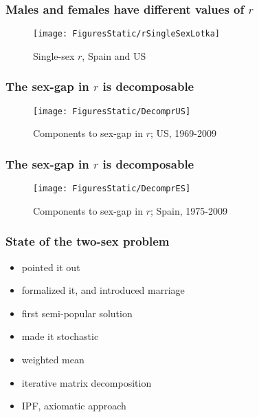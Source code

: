 \documentclass{beamer}
\begin{document}

\begin{frame}
  \frametitle{Males and females have different values of $r$}
  \vspace{-2em}
  \begin{figure}
  \centering
  \caption*{Single-sex $r$, Spain and US}
  \texttt{[image: FiguresStatic/rSingleSexLotka]}
\end{figure}
\end{frame}


\begin{frame}
  \frametitle{The sex-gap in $r$ is decomposable}
  \vspace{-2em}
\begin{figure}
\centering
\caption*{Components to sex-gap in $r$; US, 1969-2009}
\texttt{[image: FiguresStatic/DecomprUS]}
\end{figure}
\end{frame}


\begin{frame}
  \frametitle{The sex-gap in $r$ is decomposable}
  \vspace{-2em}
\begin{figure}
\centering
\caption*{Components to sex-gap in $r$; Spain, 1975-2009}
\texttt{[image: FiguresStatic/DecomprES]}
\end{figure}
\end{frame}


\begin{frame} 
  
  \frametitle{State of the two-sex problem}
  \begin{itemize}[<+->]
    \item \cite{kuczynski1932fertility} pointed it out
    \item \cite{karmel1947relations,karmel1948analysis,
    karmel1948measurement, karmel1948relations} formalized it, and introduced marriage
    \item \cite{pollard1948measurement} first semi-popular solution
    \item \cite{kendall1949stochastic} made it stochastic
    \item \cite{goodman1953population, goodman1967age} weighted mean
    \item \cite{henry1972nuptiality} iterative matrix decomposition
    \item \cite{mcfarland1972comparison, mc1975models} IPF, axiomatic
    approach
  \end{itemize}
\end{frame}
\end{document}
